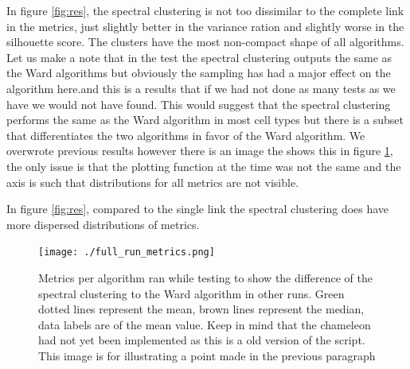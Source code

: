 \documentclass[12pt, a4paper]{article}
\begin{document}
\begin{multicols}{2}
                In figure \ref{fig:res}, the spectral clustering is not too dissimilar to the complete link in the metrics, just slightly better in the variance ration and slightly worse in the silhouette score. The clusters have the most non-compact shape of all algorithms. Let us make a note that in the test the spectral clustering outputs the same as the Ward algorithms but obviously the sampling has had a major effect on the algorithm here.and this is a results that if we had not done as many tests as we have we would not have found. This would suggest that the spectral clustering performs the same as the Ward algorithm in most cell types but there is a subset that differentiates the two algorithms in favor of the Ward algorithm. We overwrote previous results however there is an image the shows this in figure \ref{fig:forSpectral}, the only issue is that the plotting function at the time was not the same and the axis is such that distributions for all metrics are not visible.
                \newline

                In figure \ref{fig:res}, compared to the single link the spectral clustering does have more dispersed distributions of metrics.
                \newline

                \end{multicols}

                    \begin{figure}[H]
                        \begin{center}
                            \texttt{[image: ./full\_run\_metrics.png]}
                        \end{center}
                        \caption{Metrics per algorithm ran while testing to show the difference of the spectral clustering to the Ward algorithm in other runs. Green dotted lines represent the mean, brown lines represent the median, data labels are of the mean value. Keep in mind that the chameleon had not yet been implemented as this is a old version of the script. This image is for illustrating a point made in the previous paragraph}\label{fig:forSpectral}
                    \end{figure}
\end{document}
